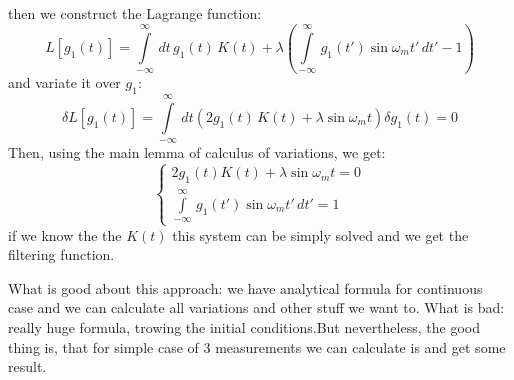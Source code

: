 \documentclass[notitlepage,a4paper,11pt,hyperref=pdftex]{revtex4-1}
\newcommand{\I}[2]{\int\limits_{#1}^{#2}\,}
\begin{document}
then we construct the Lagrange function:
\begin{equation}
 L[g_1(t)] = \I{-\infty}{\infty}dt\,g_1(t)\,K(t) + \lambda(\I{-\infty}{\infty}g_1(t')\sin\omega_mt'\,dt' -1)
\end{equation}
and variate it over $g_1$:
\begin{equation}
 \delta L[g_1(t)] = \I{-\infty}{\infty}dt(2g_1(t)\,K(t) + \lambda\sin\omega_mt)\delta g_1(t) = 0
\end{equation}
Then, using the main lemma of calculus of variations, we get:
\begin{equation}
\begin{cases}
 2 g_1(t)K(t) + \lambda\sin\omega_mt = 0\\
\I{-\infty}{\infty}g_1(t')\sin\omega_mt'\,dt' =1
\end{cases}
\end{equation}
 if we know the the $K(t)$ this system can be simply solved and we get the filtering function.

What is good about this approach: we have analytical formula for continuous case and we can calculate all variations and other stuff we want to.
What is bad: really huge formula, trowing the initial conditions.But nevertheless, the good thing is, that for simple case of 3 measurements we can calculate is and get some result.
\end{document}
